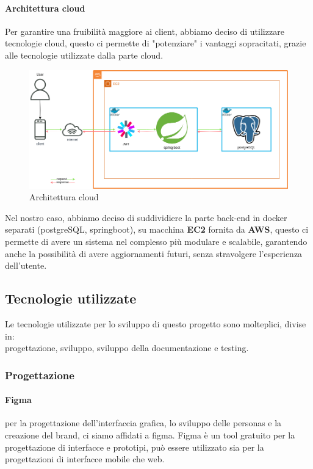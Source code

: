 \paragraph{Architettura cloud}
Per garantire una fruibilità maggiore ai client, abbiamo deciso di utilizzare tecnologie cloud, questo ci permette di "potenziare" i vantaggi sopracitati, grazie alle tecnologie utilizzate dalla parte cloud.
\begin{figure}[H]
  \centering
  \includegraphics[scale=0.45]{img/architectureDesign/AWS.png}
  \caption{Architettura cloud}
\end{figure}
Nel nostro caso, abbiamo deciso di suddividiere la parte back-end in docker separati (postgreSQL, springboot), su macchina \textbf{EC2} fornita da \textbf{AWS}, questo ci permette di avere un sistema nel complesso più modulare e scalabile, garantendo anche la possibilità di avere aggiornamenti futuri, senza stravolgere l'esperienza dell'utente.
\newpage
\subsection{Tecnologie utilizzate}
Le tecnologie utilizzate per lo sviluppo di questo progetto sono molteplici, divise in:\\
progettazione, sviluppo, sviluppo della documentazione e testing.
\subsubsection{Progettazione}
\paragraph{Figma} per la progettazione dell'interfaccia grafica, lo sviluppo delle personas e la creazione del brand, ci siamo affidati a figma. Figma è un tool gratuito per la progettazione di interfacce e prototipi, può essere utilizzato sia per la progettazioni di interfacce mobile che web.
